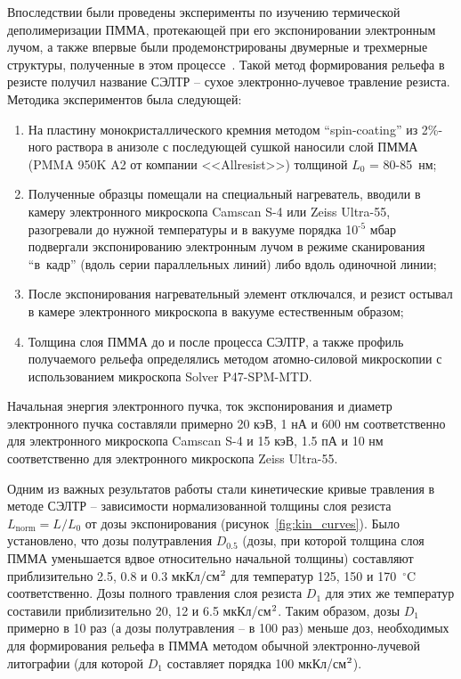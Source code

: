 Впоследствии были проведены эксперименты по изучению термической деполимеризации ПММА, протекающей при его экспонировании электронным лучом, а также впервые были продемонстрированы двумерные и трехмерные структуры, полученные в этом процессе~\cite{Bruk_2013}. Такой метод формирования рельефа в резисте получил название СЭЛТР -- сухое электронно-лучевое травление резиста. Методика экспериментов была следующей:
\begin{enumerate}
	\item На пластину монокристаллического кремния методом ``spin-coating'' из 2\%-ного раствора в анизоле с последующей сушкой наносили слой \linebreak ПММА (PMMA 950K A2 от компании <<Allresist>>) толщиной \linebreak $L_0$ = 80-85~нм;
	\item Полученные образцы помещали на специальный нагреватель, вводили в камеру электронного микроскопа Camscan S-4 или Zeiss Ultra-55, разогревали до нужной температуры и в вакууме порядка 10$^\text{-5}$ мбар подвергали экспонированию электронным лучом в режиме сканирования ``в~кадр'' (вдоль серии параллельных линий) либо вдоль одиночной линии;
	\item После экспонирования нагревательный элемент отключался, и резист остывал в камере электронного микроскопа в вакууме естественным образом;
	\item Толщина слоя ПММА до и после процесса СЭЛТР, а также профиль получаемого рельефа определялись методом атомно-силовой микроскопии с использованием микроскопа Solver P47-SPM-MTD.
\end{enumerate}

Начальная энергия электронного пучка, ток экспонирования и диаметр электронного пучка составляли примерно 20 кэВ, 1 нА и 600 нм соответственно для электронного микроскопа Camscan S-4 и 15 кэВ, 1.5 пА и 10 нм соответственно для электронного микроскопа Zeiss Ultra-55.

Одним из важных результатов работы стали кинетические кривые травления в методе СЭЛТР -- зависимости нормализованной толщины слоя резиста $L_\mathrm{norm} = L/L_0$ от дозы экспонирования (рисунок~\ref{fig:kin_curves}). Было установлено, что дозы полутравления $D_\text{0.5}$ (дозы, при которой толщина слоя ПММА уменьшается вдвое относительно начальной толщины) составляют приблизительно 2.5, 0.8 и 0.3 мкКл/см$^\text{2}$ для температур 125, 150 и 170~$^\circ$C соответственно. Дозы полного травления слоя резиста $D_\text{1}$ для этих же температур составили приблизительно 20, 12 и 6.5 мкКл/см$^\text{2}$. Таким образом, дозы $D_\text{1}$ примерно в 10 раз (а дозы полутравления -- в 100 раз) меньше доз, необходимых для формирования рельефа в ПММА методом обычной электронно-лучевой литографии (для которой $D_\text{1}$ составляет порядка 100 мкКл/см$^\text{2}$).

